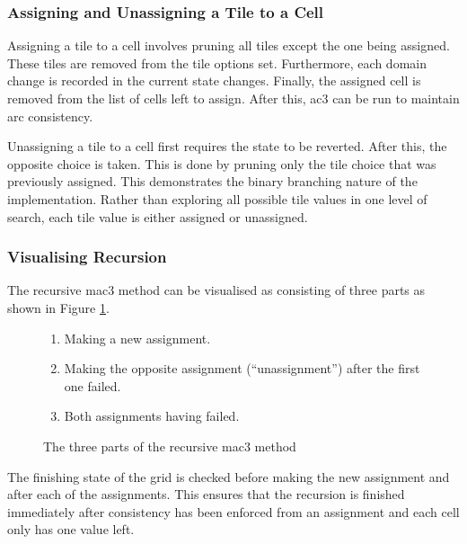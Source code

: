 \subsubsection{Assigning and Unassigning a Tile to a Cell}
Assigning a tile to a cell involves pruning all tiles except the one being assigned. These tiles are removed from the tile options set. Furthermore, each domain change is recorded in the current state changes. Finally, the assigned cell is removed from the list of cells left to assign. After this, \acrshort{ac3} can be run to maintain arc consistency.


Unassigning a tile to a cell first requires the state to be reverted. After this, the opposite choice is taken. This is done by pruning only the tile choice that was previously assigned. This demonstrates the binary branching nature of the implementation. Rather than exploring all possible tile values in one level of search, each tile value is either assigned or unassigned.

\subsubsection{Visualising Recursion}
The recursive \acrshort{mac3} method can be visualised as consisting of three parts as shown in Figure \ref{fig:mac3Recursion}.

\begin{figure}[H]
    \begin{framed}
        \begin{enumerate}
            \item Making a new assignment.
            \item Making the opposite assignment (``unassignment'') after the first one failed.
            \item Both assignments having failed.
        \end{enumerate}
    \end{framed}
    \caption{The three parts of the recursive \acrshort{mac3} method}
    \label{fig:mac3Recursion}
\end{figure}

The finishing state of the grid is checked before making the new assignment and after each of the assignments. This ensures that the recursion is finished immediately after consistency has been enforced from an assignment and each cell only has one value left.